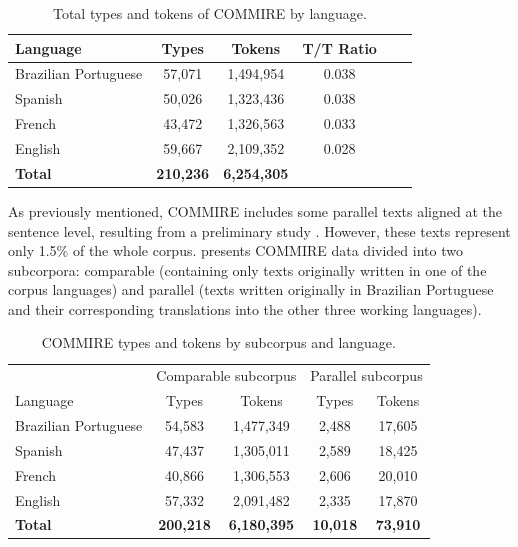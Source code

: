 \documentclass[english]{textolivre}
\begin{document}
\begin{table}[htbp]
\centering
\caption{Total types and tokens of COMMIRE by language.}
\begin{tabular}{ lccccc } 
\toprule
Language & Types & Tokens & T/T Ratio \\
\midrule
Brazilian Portuguese & 57,071 & 1,494,954 & 0.038 \\ 
Spanish & 50,026 & 1,323,436 & 0.038 \\
French & 43,472 & 1,326,563 & 0.033 \\
English & 59,667 & 2,109,352 & 0.028 \\
\textbf{Total} & \textbf{210,236} & \textbf{6,254,305} & \\
\bottomrule
\end{tabular}
\label{Table03}
\end{table}

As previously mentioned, COMMIRE includes some parallel texts aligned at the sentence level, resulting from a preliminary study \cite{furtado_primeiros_2017,furtado_compilacao_2019-1,furtado_glossario_2019}. However, these texts represent only 1.5\% of the whole corpus.  presents COMMIRE data divided into two subcorpora: comparable (containing only texts originally written in one of the corpus languages) and parallel (texts written originally in Brazilian Portuguese and their corresponding translations into the other three working languages).

\begin{table}[htbp]
\centering
\caption{COMMIRE types and tokens by subcorpus and language.}
\begin{tabular}{lcccc}
\toprule
 & \multicolumn{2}{c}{Comparable subcorpus} & \multicolumn{2}{c}{Parallel subcorpus} \\
Language & Types & Tokens & Types & Tokens \\
\midrule
Brazilian Portuguese & 54,583 & 1,477,349 & 2,488 & 17,605 \\
Spanish & 47,437 & 1,305,011 & 2,589 & 18,425 \\
French & 40,866 & 1,306,553 & 2,606 & 20,010 \\
English & 57,332 & 2,091,482 & 2,335 & 17,870 \\
\textbf{Total} &\textbf{200,218} & \textbf{6,180,395} & \textbf{10,018} & \textbf{73,910} \\
\bottomrule
\end{tabular}
\label{Table04}
\end{table}
\end{document}
